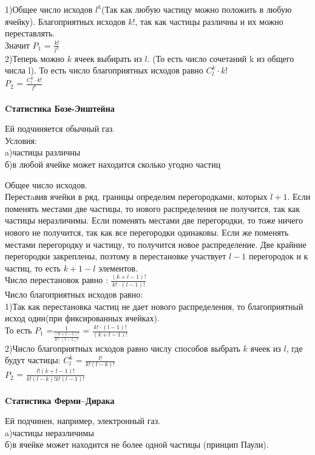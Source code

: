 \documentclass[russian, 12pt, fleqn,x11names]{article}
\begin{document}
1)Общее число исходов $l^k$(Так как любую частицу можно положить в любую ячейку). Благоприятных исходов $k!$, так как частицы различны и их можно переставлять.\\
Значит $P_1$ = $\frac{k!}{l^k}$\\
2)Теперь можно $k$ ячеек выбирать из $l$. (То есть число сочетаний k из общего числа l). То есть число благоприятных исходов равно $C^k_l \cdot k!$\\
$P_2$ = $\frac{C_l^k\cdot k!}{l^k}$\\
\\
\textbf{Cтатистика Бозе-Энштейна}
\begin{tabbing}
Ей подчиняется обычный газ.\\
Условия:\\
\qquad a)частицы различны\\
\qquad б)в любой ячейке может находится сколько угодно частиц\\
\end{tabbing}
Общее число исходов.\\
Перестaвив ячейки в ряд, границы определим перегородками, которых $l + 1$. Если поменять местами две частицы, то нового распределения не получится, так как частицы неразличимы. Если поменять местами две перегородки, то тоже ничего нового не получится, так как все перегородки одинаковы. Если же поменять местами перегородку и частицу, то получится новое распределение. Две крайние перегородки закреплены, поэтому в перестановке участвует $ l - 1$ перегородок и к частиц, то есть  $k + 1 - l$ элементов.\\
Число перестановок равно : $\frac{(k + l - 1)!}{k!\cdot (l - 1)!}$\\
Число благоприятных исходов равно:\\
1)Так как перестановка частиц не дает нового распределения, то благоприятный исход один(при фиксированных ячейках).\\
То есть $P_1$ =$\frac{1}{\frac{(k + l - 1)!}{k!\cdot(l-1)!}}$ = $\frac{k!\cdot(l-1)!}{(k + l - 1)!}$\\
2)Число благоприятных исходов равно числу способов выбрать $k$ ячеек из $l$, где будут частицы: $C^k_l$ = $\frac{l!}{k!(l - k)!}$\\
$P_2$ = $\frac{l!(k + l - 1)!}{k!(l - k)!k!(l - 1)!}$ \\
\\
\textbf{Cтатистика Ферми--Дирака}
\begin{tabbing}
Ей подчинен, например, электронный газ.\\
\qquad a)частицы неразличимы\\
\qquad б)в ячейке может находится не более одной частицы (принцип Паули).
\end{tabbing}
\end{document}
